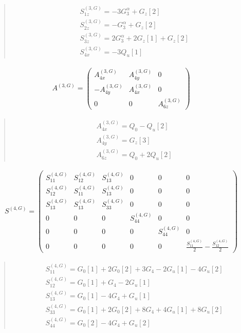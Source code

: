 \documentclass[fleqn,10pt]{jsarticle}
\begin{document}
\begin{quote}
\begin{align*}
& S^{(3,G)}_{1z} = - 3 G_{3}^{\alpha} + G_{z}[2] \\
& S^{(3,G)}_{2z} = - G_{3}^{\alpha} + G_{z}[2] \\
& S^{(3,G)}_{3z} = 2 G_{3}^{\alpha} + 2 G_{z}[1] + G_{z}[2] \\
& S^{(3,G)}_{4x} = - 3 Q_{u}[1]
\end{align*}
\end{quote}
\begin{align*}
A^{(3,G)} = \begin{pmatrix} A^{(3,G)}_{4x} & A^{(3,G)}_{4y} & 0 \\ - A^{(3,G)}_{4y} & A^{(3,G)}_{4x} & 0 \\ 0 & 0 & A^{(3,G)}_{6z} \end{pmatrix}
\end{align*}
\begin{quote}
\begin{align*}
& A^{(3,G)}_{4x} = Q_{0} - Q_{u}[2] \\
& A^{(3,G)}_{4y} = G_{z}[3] \\
& A^{(3,G)}_{6z} = Q_{0} + 2 Q_{u}[2]
\end{align*}
\end{quote}
\begin{align*}
S^{(4,G)} = \begin{pmatrix} S^{(4,G)}_{11} & S^{(4,G)}_{12} & S^{(4,G)}_{13} & 0 & 0 & 0 \\ S^{(4,G)}_{12} & S^{(4,G)}_{11} & S^{(4,G)}_{13} & 0 & 0 & 0 \\ S^{(4,G)}_{13} & S^{(4,G)}_{13} & S^{(4,G)}_{33} & 0 & 0 & 0 \\ 0 & 0 & 0 & S^{(4,G)}_{44} & 0 & 0 \\ 0 & 0 & 0 & 0 & S^{(4,G)}_{44} & 0 \\ 0 & 0 & 0 & 0 & 0 & \frac{S^{(4,G)}_{11}}{2} - \frac{S^{(4,G)}_{12}}{2} \end{pmatrix}
\end{align*}
\begin{quote}
\begin{align*}
& S^{(4,G)}_{11} = G_{0}[1] + 2 G_{0}[2] + 3 G_{4} - 2 G_{u}[1] - 4 G_{u}[2] \\
& S^{(4,G)}_{12} = G_{0}[1] + G_{4} - 2 G_{u}[1] \\
& S^{(4,G)}_{13} = G_{0}[1] - 4 G_{4} + G_{u}[1] \\
& S^{(4,G)}_{33} = G_{0}[1] + 2 G_{0}[2] + 8 G_{4} + 4 G_{u}[1] + 8 G_{u}[2] \\
& S^{(4,G)}_{44} = G_{0}[2] - 4 G_{4} + G_{u}[2]
\end{align*}
\end{quote}
\end{document}
